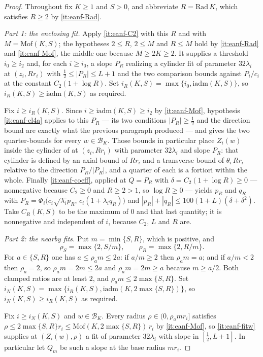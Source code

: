 \begin{proof}
Throughout fix $K\ge1$ and $S>0$, and abbreviate $R=\mathrm{Rad}\,K$, which
satisfies $R\ge2$ by \ref{it:eanf-Rad}.

\emph{Part 1: the enclosing fit.} Apply \ref{it:eanf-C2} with this $R$ and with
$M=\mathrm{Mof}(K,S)$; the hypotheses $2\le R$, $2\le M$ and $R\le M$ hold by
\ref{it:eanf-Rad} and \ref{it:eanf-Mof}, the middle one because
$M\ge2K\ge2$. It supplies a threshold $i_0\ge i_2$ and, for each $i\ge i_0$, a
slope $P_R$ realizing a cylinder fit of parameter $32\lambda_i$ at
$(z_i,Rr_i)$ with $\tfrac12\le|P_R|\le L+1$ and the two comparison bounds
against $P_i/c_i$ at the constant $C_2(1+\log R)$. Set
$i_R(K,S)=\max\{i_0,\mathrm{iadm}(K,S)\}$, so $i_R(K,S)\ge\mathrm{iadm}(K,S)$
as required.

Fix $i\ge i_R(K,S)$. Since $i\ge\mathrm{iadm}(K,S)\ge i_2$ by
\ref{it:eanf-Mof}, hypothesis \ref{it:eanf-cl4a} applies to this $P_R$ --- its
two conditions $|P_R|\ge\tfrac12$ and the direction bound are exactly what the
previous paragraph produced --- and gives the two quarter-bounds for every
$w\in\mathcal B_K$. Those bounds in particular place $Z_i(w)$ inside the
cylinder of  at $(z_i,Rr_i)$ with parameter $32\lambda_i$
and slope $P_R$: that cylinder is defined by an axial bound of $Rr_i$ and a
transverse bound of $\theta_i\,Rr_i$ relative to the direction $P_R/|P_R|$, and
a quarter of each is a fortiori within the whole. Finally
\ref{it:eanf-coeff}, applied at $Q=P_R$ with
$\delta=C_2(1+\log R)\ge0$ --- nonnegative because $C_2\ge0$ and $R\ge2>1$, so
$\log R\ge0$ --- yields $p_R$ and $q_R$ with
$P_R=\Phi_i\bigl(c_i\sqrt{\lambda_i}p_R,\,c_i(1+\lambda_iq_R)\bigr)$ and
$|p_R|+|q_R|\le100(1+L)(\delta+\delta^2)$. Take $C_R(K,S)$ to be the maximum of
$0$ and that last quantity; it is nonnegative and independent of $i$, because
$C_2$, $L$ and $R$ are.

\emph{Part 2: the nearby fits.} Put $m=\min\{S,R\}$, which is positive, and
\[
  \rho_S=\max\{2,S/m\},\qquad \rho_R=\max\{2,R/m\} .
\]
For $a\in\{S,R\}$ one has $a\le\rho_am\le2a$: if $a/m\ge2$ then $\rho_am=a$;
and if $a/m<2$ then $\rho_a=2$, so $\rho_am=2m\le2a$ and $\rho_am=2m\ge a$
because $m\ge a/2$. Both clamped ratios are at least $2$, and
$\rho_am\le2\max\{S,R\}$. Set
$i_N(K,S)=\max\{i_R(K,S),\mathrm{iadm}(K,2\max\{S,R\})\}$, so
$i_N(K,S)\ge i_R(K,S)$ as required.

Fix $i\ge i_N(K,S)$ and $w\in\mathcal B_K$. Every radius
$\rho\in(0,\rho_amr_i]$ satisfies
$\rho\le2\max\{S,R\}r_i\le\mathrm{Mof}(K,2\max\{S,R\})\,r_i$ by
\ref{it:eanf-Mof}, so \ref{it:eanf-fitw} supplies at $(Z_i(w),\rho)$ a fit of
parameter $32\lambda_i$ with slope in $[\tfrac12,L+1]$. In particular let $Q_m$
be such a slope at the base radius $mr_i$.


\end{proof}
